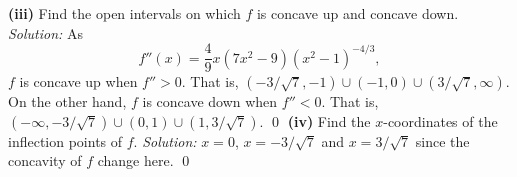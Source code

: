 \documentclass{article}
\begin{document}
\newline
\newline\textbf{(iii)} Find the open intervals on which $f$ is concave up and concave down.
\newline\newline\textit{Solution:} As \[f''\left( x \right)=\frac{4}{9}x\left( 7{{x}^{2}}-9 \right){{\left( {{x}^{2}}-1 \right)}^{-4/3}},\] $f$ is concave up when $f''>0$. That is, $\left( -3/\sqrt{7},-1 \right)\cup \left( -1,0 \right)\cup \left( 3/\sqrt{7},\infty  \right)$.
\newline\newline On the other hand, $f$ is concave down when $f''<0$. That is, $\left( -\infty ,-3/\sqrt{7} \right)\cup (0,1)\cup (1,3/\sqrt{7})$. \qed
\newline
\newline\textbf{(iv)} Find the $x$-coordinates of the inflection points of $f$.
\newline
\newline\textit{Solution:} $x=0$, $x=-3/\sqrt{7}$ and $x=3/\sqrt{7}$ since the concavity of $f$ change here. \qed 
\newpage
\end{document}

